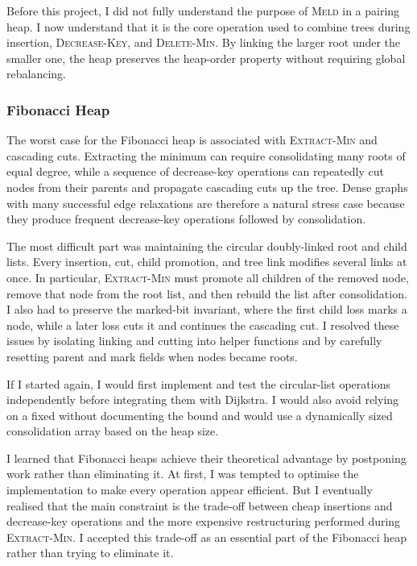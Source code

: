 Before this project, I did not fully understand the purpose of \textsc{Meld} in a pairing heap. I now understand that it is the core operation used to combine trees during insertion, \textsc{Decrease-Key}, and \textsc{Delete-Min}. By linking the larger root under the smaller one, the heap preserves the heap-order property without requiring global rebalancing.
\subsubsection{Fibonacci Heap}

The worst case for the Fibonacci heap is associated with \textsc{Extract-Min}
and cascading cuts. Extracting the minimum can require consolidating many roots
of equal degree, while a sequence of decrease-key operations can repeatedly
cut nodes from their parents and propagate cascading cuts up the tree. Dense
graphs with many successful edge relaxations are therefore a natural stress
case because they produce frequent decrease-key operations followed by
consolidation.

The most difficult part was maintaining the circular doubly-linked root and
child lists. Every insertion, cut, child promotion, and tree link modifies
several links at once. In particular, \textsc{Extract-Min} must promote all
children of the removed node, remove that node from the root list, and then
rebuild the list after consolidation. I also had to preserve the marked-bit
invariant, where the first child loss marks a node, while a later loss cuts it and
continues the cascading cut. I resolved these issues by isolating linking and
cutting into helper functions and by carefully resetting parent and mark fields
when nodes became roots.

If I started again, I would first implement and test the circular-list
operations independently before integrating them with Dijkstra. I would also
avoid relying on a fixed  without documenting the bound and
would use a dynamically sized consolidation array based on the heap size.

I learned that Fibonacci heaps achieve their theoretical advantage by postponing work rather than eliminating it. At first, I was tempted to optimise the implementation to make every operation appear efficient. But I eventually realised that the main constraint is the trade-off between cheap insertions and decrease-key operations and the more expensive restructuring performed during \textsc{Extract-Min}. I accepted this trade-off as an essential part of the Fibonacci heap rather than trying to eliminate it.
